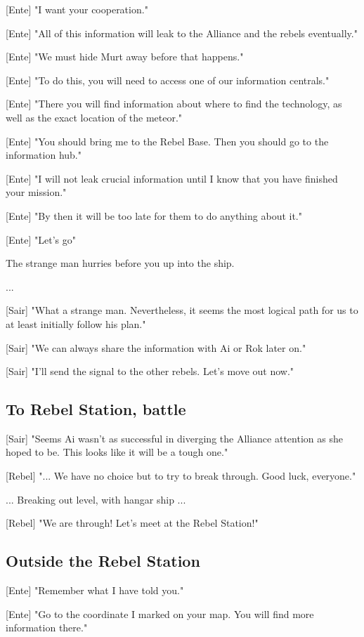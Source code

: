 \documentclass[a4paper,12pt]{article}
\begin{document}
[Ente] "I want your cooperation." 

[Ente] "All of this information will leak to the Alliance and the rebels eventually." 

[Ente] "We must hide Murt away before that happens."

[Ente] "To do this, you will need to access one of our information centrals." 

[Ente] "There you will find information about where to find the technology, as well as the exact location of the meteor."

[Ente] "You should bring me to the Rebel Base. Then you should go to the information hub."

[Ente] "I will not leak crucial information until I know that you have finished your mission."

[Ente] "By then it will be too late for them to do anything about it."

[Ente] "Let's go"

The strange man hurries before you up into the ship.

...

[Sair] "What a strange man. Nevertheless, it seems the most logical path for us to at least initially follow his plan."

[Sair] "We can always share the information with Ai or Rok later on."

[Sair] "I'll send the signal to the other rebels. Let's move out now."

\subsection{To Rebel Station, battle}

[Sair] "Seems Ai wasn't as successful in diverging the Alliance attention as she hoped to be. This looks like it will be a tough one."

[Rebel] "... We have no choice but to try to break through. Good luck, everyone."

... Breaking out level, with hangar ship ...

[Rebel] "We are through! Let's meet at the Rebel Station!"

\subsection{Outside the Rebel Station}

[Ente] "Remember what I have told you." 

[Ente] "Go to the coordinate I marked on your map. You will find more information there."
\end{document}
